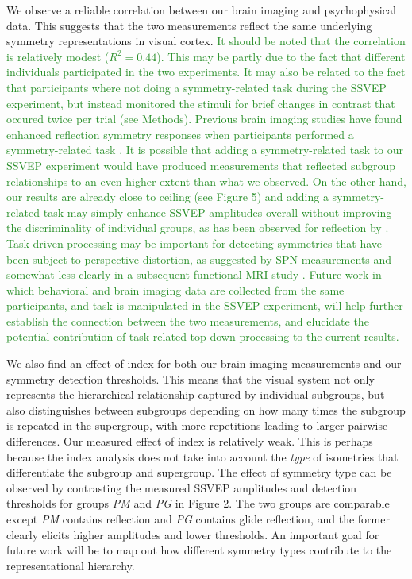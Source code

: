 \documentclass[11pt, twoside]{article}
\begin{document}
We observe a reliable correlation between our brain imaging and psychophysical data. This suggests that the two measurements reflect the same underlying symmetry representations in visual cortex. \textcolor{ForestGreen}{It should be noted that the correlation is relatively modest ($R^2 = 0.44$). This may be partly due to the fact that different individuals participated in the two experiments. It may also be related to the fact that participants where not doing a symmetry-related task during the SSVEP experiment, but instead monitored the stimuli for brief changes in contrast that occured twice per trial (see Methods). Previous brain imaging studies have found enhanced reflection symmetry responses when participants performed a symmetry-related task \citep{makin_formation_2020, Sasaki_2005, keefe_2018}. It is possible that adding a symmetry-related task to our SSVEP experiment would have produced measurements that reflected subgroup relationships to an even higher extent than what we observed. On the other hand, our results are already close to ceiling (see Figure 5) and adding a symmetry-related task may simply enhance SSVEP amplitudes overall without improving the discriminality of individual groups, as has been observed for reflection by \cite{keefe_2018}. Task-driven processing may be important for detecting symmetries that have been subject to perspective distortion, as suggested by SPN measurements \citep{makin_conditions_2015} and somewhat less clearly in a subsequent functional MRI study \citep{keefe_2018}. Future work in which behavioral and brain imaging data are collected from the same participants, and task is manipulated in the SSVEP experiment, will help further establish the connection between the two measurements, and elucidate the potential contribution of task-related top-down processing to the current results.}

We also find an effect of index for both our brain imaging measurements and our symmetry detection thresholds. This means that the visual system not only represents the hierarchical relationship captured by individual subgroups, but also distinguishes between subgroups depending on how many times the subgroup is repeated in the supergroup, with more repetitions leading to larger pairwise differences. Our measured effect of index is relatively weak. This is perhaps because the index analysis does not take into account the \textit{type} of isometries that differentiate the subgroup and supergroup. The effect of symmetry type can be observed by contrasting the measured SSVEP amplitudes and detection thresholds for groups \textit{PM} and \textit{PG} in Figure 2. The two groups are comparable except \textit{PM} contains reflection and \textit{PG} contains glide reflection, and the former clearly elicits higher amplitudes and lower thresholds. An important goal for future work will be to map out how different symmetry types contribute to the representational hierarchy. 
\end{document}
